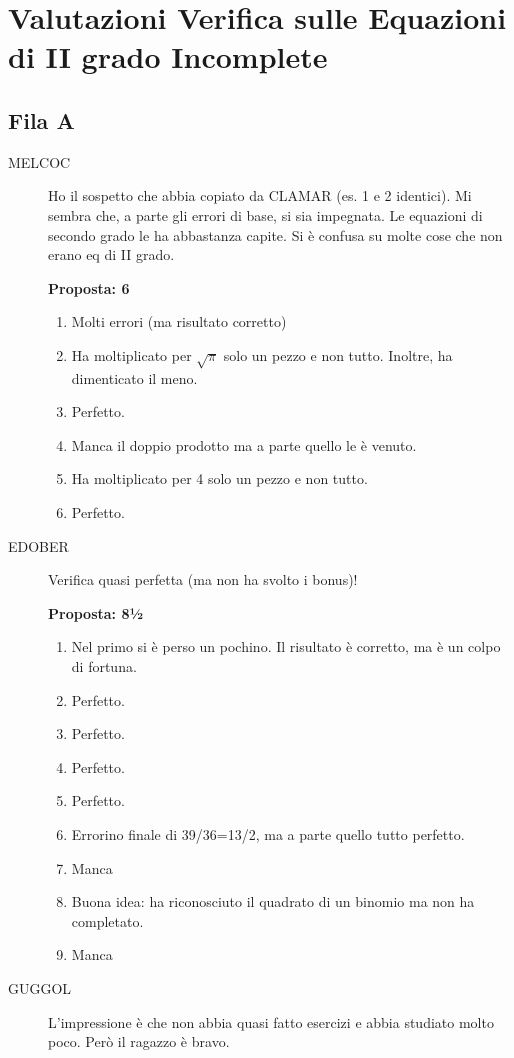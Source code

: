 \documentclass[11pt]{report}
\begin{document}
\chapter{Valutazioni Verifica sulle Equazioni di II grado Incomplete}
\section*{Fila A}
\begin{description}
    \item[MELCOC] Ho il sospetto che abbia copiato da CLAMAR (es. 1 e 2 identici). Mi sembra che, a parte gli errori di base, si sia impegnata. Le equazioni di secondo grado le ha abbastanza capite. Si è confusa su molte cose che non erano eq di II grado.
    
        \textbf{Proposta: 6}
    \begin{enumerate}
        \item Molti errori (ma risultato corretto)
        \item Ha moltiplicato per $\sqrt \pi$ solo un pezzo e non tutto. Inoltre, ha dimenticato il meno.
        \item Perfetto.
        \item Manca il doppio prodotto ma a parte quello le è venuto.
        \item Ha moltiplicato per 4 solo un pezzo e non tutto.
        \item Perfetto. 
    \end{enumerate}
    \item[EDOBER] Verifica quasi perfetta (ma non ha svolto i bonus)! 
    
    \textbf{Proposta: 8½}
    \begin{enumerate}
        \item Nel primo si è perso un pochino. Il risultato è corretto, ma è un colpo di fortuna.
        \item Perfetto.
        \item Perfetto.
        \item Perfetto.
        \item Perfetto.
        \item Errorino finale di 39/36=13/2, ma a parte quello tutto perfetto.
        \item Manca
        \item Buona idea: ha riconosciuto il quadrato di un binomio ma non ha completato.
        \item Manca
    \end{enumerate}  
    \item[GUGGOL] L'impressione è che non abbia quasi fatto esercizi e abbia studiato molto poco. Però il ragazzo è bravo.
    

\end{description}
\end{document}
